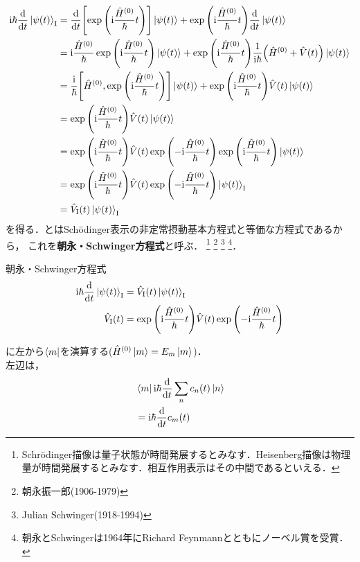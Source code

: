 \documentclass{report}
\begin{document}
  \begin{align}
    \mathrm{i}\hbar\dv{t}\ket{\psi(t)}_{\mathrm{I}} &= \dv{t}\qty[\exp\qty(\mathrm{i}\frac{\hat{H}^{(0)}}{\hbar}t)]\ket{\psi(t)} + \exp\qty(\mathrm{i}\frac{\hat{H}^{(0)}}{\hbar}t)\dv{t}\ket{\psi(t)} \\
    &= \mathrm{i}\frac{\hat{H}^{(0)}}{\hbar}\exp\qty(\mathrm{i}\frac{\hat{H}^{(0)}}{\hbar}t)\ket{\psi(t)} + \exp\qty(\mathrm{i}\frac{\hat{H}^{(0)}}{\hbar}t)\frac{1}{\mathrm{i}\hbar}\qty(\hat{H}^{(0)} + \hat{V}(t))\ket{\psi(t)} \\ 
    &= \frac{\mathrm{i}}{\hbar}\qty[\hat{H}^{(0)}, \exp\qty(\mathrm{i}\frac{\hat{H}^{(0)}}{\hbar}t)]\ket{\psi(t)} + \exp\qty(\mathrm{i}\frac{\hat{H}^{(0)}}{\hbar}t)\hat{V}(t)\ket{\psi(t)} \\ 
    &= \exp\qty(\mathrm{i}\frac{\hat{H}^{(0)}}{\hbar}t)\hat{V}(t)\ket{\psi(t)} \\
    &= \exp\qty(\mathrm{i}\frac{\hat{H}^{(0)}}{\hbar}t)\hat{V}(t)\exp\qty(-\mathrm{i}\frac{\hat{H}^{(0)}}{\hbar}t)\exp\qty(\mathrm{i}\frac{\hat{H}^{(0)}}{\hbar}t)\ket{\psi(t)} \\
    &= \exp\qty(\mathrm{i}\frac{\hat{H}^{(0)}}{\hbar}t)\hat{V}(t)\exp\qty(-\mathrm{i}\frac{\hat{H}^{(0)}}{\hbar}t)\ket{\psi(t)}_{\mathrm{I}} \\
    &= \hat{V}_{\mathrm{I}}(t)\ket{\psi(t)}_{\mathrm{I}}\label{TDSE-1st-eq-interaction-picture}
  \end{align}
  を得る．とはSch\"odinger表示の非定常摂動基本方程式と等価な方程式であるから，
  これを\textbf{朝永・Schwinger方程式}と呼ぶ．
  \footnote{Schrödinger描像は量子状態が時間発展するとみなす．Heisenberg描像は物理量が時間発展するとみなす．相互作用表示はその中間であるといえる．}  
  \footnote{朝永振一郎(1906-1979)}
  \footnote{Julian Schwinger(1918-1994)}
  \footnote{朝永とSchwingerは1964年にRichard Feynmannとともにノーベル賞を受賞．}．
  \begin{itembox}[l]{朝永・Schwinger方程式}
    \begin{align}
      \mathrm{i}\hbar\dv{t}\ket{\psi(t)}_{\mathrm{I}}&=\hat{V}_{\mathrm{I}}(t)\ket{\psi(t)}_{\mathrm{I}}\label{Tomonaga-Schwinger}\\
      \hat{V}_{\mathrm{I}}(t)&=\exp\qty(\mathrm{i}\frac{\hat{H}^{(0)}}{\hbar}t)\hat{V}(t)\exp\qty(-\mathrm{i}\frac{\hat{H}^{(0)}}{\hbar}t)
    \end{align}
  \end{itembox}
  \par
  に左から$\bra{m}$を演算する($\hat{H}^{(0)}\ket{m} = E_m\ket{m}$)．\\
  左辺は，
  \begin{align}
    &\bra{m}\mathrm{i}\hbar\dv{t}\sum_{n}c_n(t)\ket{n}\\
    & = \mathrm{i}\hbar\dv{t}c_m(t)
  \end{align}
\end{document}
